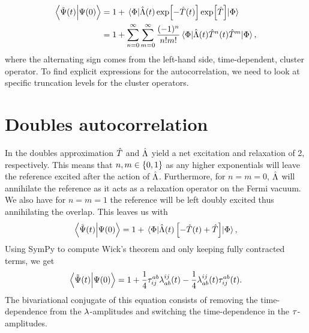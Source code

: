     \begin{align}
        \braket{\tilde{\Psi}(t)}{\Psi(0)}
        &=
        1
        +
        \mel{\Phi}{
            \hat{\Lambda}(t)
            \exp[-\hat{T}(t)]
            \exp[\hat{T}]
        }{\Phi}
        \\
        &=
        1
        + \sum_{n = 0}^{\infty}\sum_{m = 0}^{\infty}
        \frac{(-1)^{n}}{n!m!}
        \mel{\Phi}{
            \hat{\Lambda}(t)
            \hat{T}^n(t)
            \hat{T}^m
        }{\Phi},
        \label{eq:cc-autocorrelation}
    \end{align}
    where the alternating sign comes from the left-hand side, time-dependent,
    cluster operator.
    To find explicit expressions for the autocorrelation, we need to look at
    specific truncation levels for the cluster operators.

    \section{Doubles autocorrelation}
        In the doubles approximation $\hat{T}$ and $\hat{\Lambda}$ yield a net
        excitation and relaxation of 2, respectively.
        This means that $n, m \in \left\{ 0, 1 \right\}$ as any higher exponentials will
        leave the reference excited after the action of $\hat{\Lambda}$.
        Furthermore, for $n = m = 0$, $\hat{\Lambda}$ will annihilate the reference as
        it acts as a relaxation operator on the Fermi vacuum.
        We also have for $n = m = 1$ the reference will be left doubly excited
        thus annihilating the overlap.
        This leaves us with
        \begin{gather}
            \braket{\tilde{\Psi}(t)}{\Psi(0)}
            = 1
            + \mel{\Phi}{
                \hat{\Lambda}(t)\left[ 
                    -\hat{T}(t) + \hat{T}\right]
            }{\Phi},
        \end{gather}
        Using SymPy \cite{sympy} to compute Wick's theorem and only keeping
        fully contracted terms, we get
        \begin{gather}
            \braket{\tilde{\Psi}(t)}{\Psi(0)}
            = 1
            + \frac{1}{4}\tau^{ab}_{ij} \lambda^{ij}_{ab}(t)
            - \frac{1}{4}\lambda^{ij}_{ab}(t) \tau^{ab}_{ij}(t).
        \end{gather}
        The bivariational conjugate of this equation consists of removing the
        time-dependence from the $\lambda$-amplitudes and switching the
        time-dependence in the $\tau$-amplitudes.


